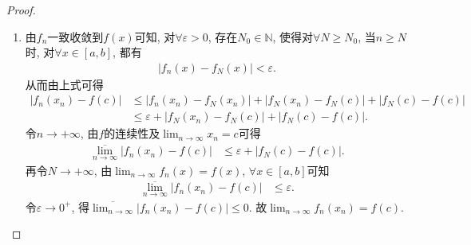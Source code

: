 \documentclass[../../main.tex]{subfiles}
\begin{document}
\begin{proof}
\begin{enumerate}
\item 由\(f_n\)一致收敛到\(f(x)\)可知, 对\(\forall \varepsilon > 0\), 存在\(N_0\in \mathbb{N}\), 使得对\(\forall N\geqslant N_0\), 当\(n\geqslant N\)时, 对\(\forall x\in [a,b]\), 都有
\begin{align*}
|f_n(x) - f_N(x)| < \varepsilon.
\end{align*}
从而由上式可得
\begin{align*}
|f_n(x_n) - f(c)| &\leqslant |f_n(x_n) - f_N(x_n)| + |f_N(x_n) - f_N(c)| + |f_N(c) - f(c)|\\
&\leqslant \varepsilon + |f_N(x_n) - f_N(c)| + |f_N(c) - f(c)|.
\end{align*}
令\(n\rightarrow +\infty\), 由\(f\)的连续性及\(\lim_{n\rightarrow \infty}x_n = c\)可得
\begin{align*}
\overline{\lim_{n\rightarrow \infty}}|f_n(x_n) - f(c)| &\leqslant \varepsilon + |f_N(c) - f(c)|.
\end{align*}
再令\(N\rightarrow +\infty\), 由\(\lim_{n\rightarrow \infty}f_n(x) = f(x)\), \(\forall x\in [a,b]\)可知
\begin{align*}
\overline{\lim_{n\rightarrow \infty}}|f_n(x_n) - f(c)| &\leqslant \varepsilon.
\end{align*}
令\(\varepsilon \rightarrow 0^+\), 得\(\overline{\lim_{n\rightarrow \infty}}|f_n(x_n) - f(c)| \leqslant 0\). 故\(\lim_{n\rightarrow \infty}f_n(x_n) = f(c)\). 


\end{enumerate}
\end{proof}
\end{document}
